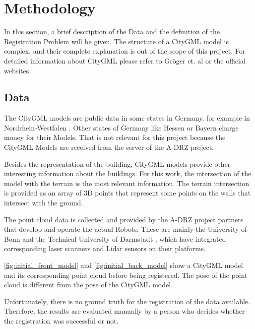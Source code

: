 

    \chapter{Methodology}
        In this section, a brief description of the Data and the definition of the Registration Problem will be given.
        The structure of a CityGML model is complex, and their complete explanation is out of the scope of this project,
        For detailed information about CityGML please refer to Gröger et. al \cite{Groger_2012_OGC} or the official websites.

    \section{Data}   
        The CityGML models are public data in some states in Germany, for example in Nordrhein-Westfalen \cite{NRW3DModel_online}. 
        Other states of Germany like Hessen \cite{Hessen3DModel_online} or Bayern \cite{Bayern3DModel_online} charge money for their Models.
        That is not relevant for this project because the CityGML Models are received from the server of the A-DRZ project.

        Besides the representation of the building, CityGML models provide other interesting information about the buildings.
        For this work, the intersection of the model with the terrain is the most relevant information.
        The terrain intersection is provided as an array of 3D points that represent some points on the walls that intersect with the
        ground. 
        
        The point cloud data is collected and provided by the A-DRZ project partners that develop and operate the actual Robots.
        These are mainly the University of Bonn \cite{UniBonn_online} and the Technical University of Darmstadt \cite{TUDarmstadt_online},
        which have integrated corresponding laser scanners and Lidar sensors on their platforms.

        \autoref{fig:initial_front_model} and \autoref{fig:initial_back_model} show a CityGML model and its corresponding point cloud
        before being registered. The pose of the point cloud is different from the pose of the CityGML model.
            
        Unfortunately, there is no ground truth for the registration of the data available. 
        Therefore, the results are evaluated manually by a person who decides whether the registration was successful or not.

